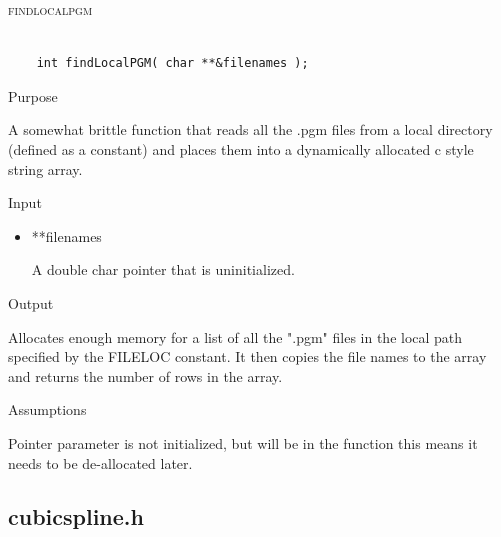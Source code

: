 \documentclass[pdftex, 11pt]{article}
\begin{document}
\begin{description}
\begin{description}
		\end{description}



	\item{\textsc{findlocalpgm}}

		\begin{lstlisting}

	int findLocalPGM( char **&filenames );
		\end{lstlisting}

		\begin{description}
			\item{Purpose}

				A somewhat brittle function that reads all the .pgm files from a local
				directory (defined as a constant) and places them into a dynamically
				allocated c style string array.

			\item{Input}

				\begin{itemize}

					\item{**filenames}
						
						A double char pointer that is uninitialized.

				\end{itemize}

			\item{Output}

				Allocates enough memory for a list of all the ".pgm" files
				in the local path specified by the FILELOC constant.  It
				then copies the file names to the array and returns the
				number of rows in the array.

			\item{Assumptions}

				Pointer parameter is not initialized, but will be in the function
				this means it needs to be de-allocated later.

		\end{description}


\end{description}

\subsection{cubicspline.h}
\end{document}
